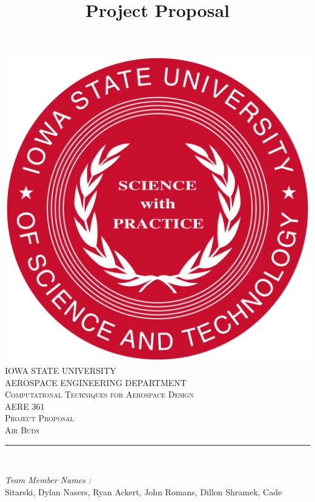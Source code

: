 \documentclass[12pt]{article}
\begin{document}
\title{Project Proposal}

\begin{titlepage}
	\centering
    \vspace*{0.5 cm}
    \includegraphics[scale = 0.11]{isu_seal.png}\\[1.0 cm]	%
    \textsc{\LARGE IOWA STATE UNIVERSITY}\\[2.0 cm]
    \textsc{\large AEROSPACE ENGINEERING DEPARTMENT}\\[0.2 cm]
    \textsc{\large Computational Techniques for Aerospace Design}\\[0.2 cm]
	\textsc{\Large AERE 361}\\[0.5 cm]				%
	\textsc{\Large Project Proposal}\\[0.2 cm]
	\textsc{\Large Air Buds}\\[0.2 cm]
	\rule{\linewidth}{0.2 mm} \\[0.4 cm]
	
	
	\begin{minipage}{0.8\textwidth}
		
			\begin{flushleft} 
			\emph{Team Member Names :} \\
			Sitarski, Dylan\linebreak
		    Nasers, Ryan\linebreak
			Ackert, John\linebreak
			Romans, Dillon\linebreak
			Shramek, Cade\linebreak
			
		\end{flushleft}
	\end{minipage}\\[2 cm]
	
	\vfill
	
\end{titlepage}
\end{document}
